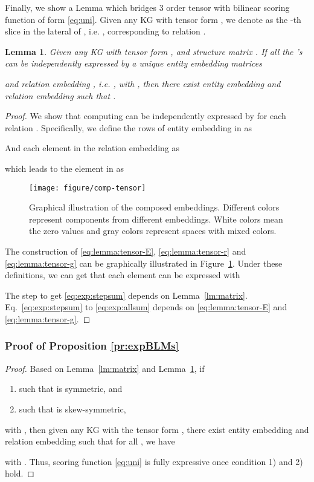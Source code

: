 \documentclass[10pt,journal,compsoc]{IEEEtran}
\newtheorem{lemma}{Lemma}
\begin{document}
Finally,
we show a Lemma
which bridges
3 order tensor  with 
bilinear scoring function of form \eqref{eq:uni}.
Given any KG with tensor form ,
we denote 
as the -th slice in the lateral of , i.e. ,
corresponding to relation .

\begin{lemma}
\label{lm:tensor}
Given any KG with tensor form ,
and structure matrix .
If all the 's can be
independently expressed by a unique entity embedding matrices 

and relation embedding ,
i.e. ,
with ,
then there exist entity embedding  
and relation embedding  
such that
.
\end{lemma}

\begin{proof}
We show that computing 
can be independently expressed by  for each relation .
Specifically,
we define the rows of entity embedding in  as

And each element in the relation embedding  as 

which leads to the element in   as


\begin{figure}[ht]
	\centering
	\texttt{[image: figure/comp-tensor]}
	\vspace{-5px}
	\caption{Graphical illustration of the composed embeddings. Different colors represent components from different embeddings. White colors mean the zero values and gray colors represent spaces with mixed colors.}
	\label{fig:comp-tensor}
\end{figure}

The construction of \eqref{eq:lemma:tensor-E}, \eqref{eq:lemma:tensor-r} and \eqref{eq:lemma:tensor-g} can be graphically illustrated in Figure~\ref{fig:comp-tensor}.
Under these definitions,
we can get that each element  can be expressed with

The step to get \eqref{eq:exp:stepsum} depends on Lemma~\ref{lm:matrix}.
Eq.~\eqref{eq:exp:stepsum} to \eqref{eq:exp:allsum} depends on \eqref{eq:lemma:tensor-E} and \eqref{eq:lemma:tensor-g}.
\end{proof}


\subsubsection{Proof of Proposition \ref{pr:expBLMs}}


\begin{proof}
Based on Lemma~\ref{lm:matrix} and Lemma~\ref{lm:tensor},
if
\begin{enumerate}[leftmargin=*]
	\item  
	such that 
	 is symmetric,
	and
	\item  
such that 
	 is skew-symmetric,
\end{enumerate}
with 
,
then
given any KG with the tensor form ,
there exist entity embedding 
and relation embedding  
such that for all , we have
 
with .
Thus,
scoring function
\eqref{eq:uni} is fully expressive once condition 1) and 2) hold.
\end{proof}
\end{document}
